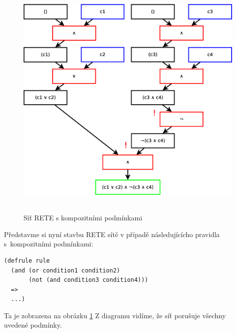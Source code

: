 \begin{figure}[h]
\centering
\includegraphics[height=12cm]{rete-beta-comp-conds.eps}
\caption{Síť RETE s kompozitními podmínkami}
\label{rete-beta-comp-conds}
\end{figure}

Představme si nyní stavbu RETE sítě v případě následujícícho pravidla
s~kompozitními podmínkami:
\begin{verbatim}
(defrule rule
  (and (or condition1 condition2)
       (not (and condition3 condition4)))
  =>
  ...)
\end{verbatim}
Ta je zobrazena na obrázku \ref{rete-beta-comp-conds} Z diagramu vidíme, že síť porušuje všechny
uvedené podmínky.

